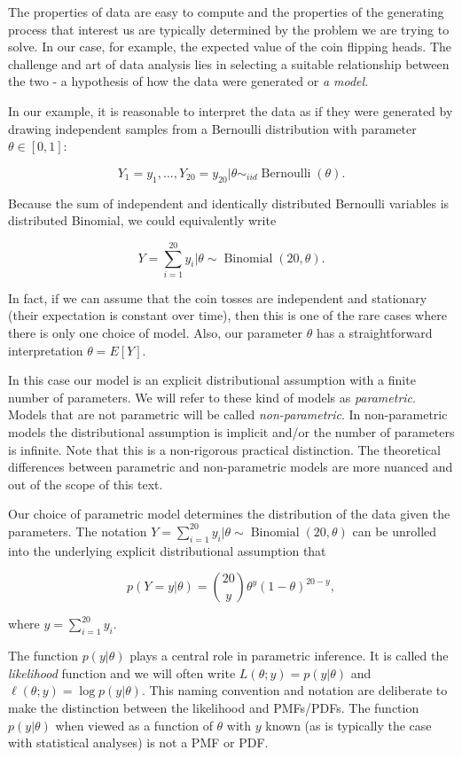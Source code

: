 \documentclass{book}
\theoremstyle{plain}%
\theoremstyle{definition}
\DeclareMathOperator{\Binomial}{Binomial}
\DeclareMathOperator{\Bernoulli}{Bernoulli}
\begin{document}
The properties of data are easy to compute and the properties of the generating process that interest us are typically determined by the problem we are trying to solve. In our case, for example, the expected value of the coin flipping heads. The challenge and art of data analysis lies in selecting a suitable relationship between the two - a hypothesis of how the data were generated or \emph{a model}.

In our example, it is reasonable to interpret the data as if they were generated by drawing independent samples from a Bernoulli distribution with parameter $\theta \in [0,1]$:

$$Y_1 = y_1,...,Y_{20} = y_{20}|\theta\sim_{iid} \Bernoulli(\theta).$$

Because the sum of independent and identically distributed Bernoulli variables is distributed Binomial, we could equivalently write 

$$Y = \sum_{i = 1}^{20} y_i|\theta \sim \Binomial(20, \theta).$$

In fact, if we can assume that the coin tosses are independent and stationary (their expectation is constant over time), then this is one of the rare cases where there is only one choice of model. Also, our parameter $\theta$ has a straightforward interpretation $\theta = E[Y]$.

In this case our model is an explicit distributional assumption with a finite number of parameters. We will refer to these kind of models as \emph{parametric}. Models that are not parametric will be called \emph{non-parametric}. In non-parametric models the distributional assumption is implicit and/or the number of parameters is infinite. Note that this is a non-rigorous practical distinction. The theoretical differences between parametric and non-parametric models are more nuanced and out of the scope of this text.

Our choice of parametric model determines the distribution of the data given the parameters. The notation $Y = \sum_{i = 1}^{20} y_i|\theta \sim \Binomial(20, \theta)$ can be unrolled into the underlying explicit distributional assumption that

$$p(Y = y|\theta) = {20 \choose y} \theta^{y}(1-\theta)^{20 - y},$$

where $y = \sum_{i = 1}^{20} y_i$.

The function $p(y|\theta)$ plays a central role in parametric inference. It is called the \textit{likelihood} function and we will often write $L(\theta;y) = p(y|\theta)$ and $\ell(\theta;y) = \log p(y|\theta)$. This naming convention and notation are deliberate to make the distinction between the likelihood and PMFs/PDFs. The function $p(y|\theta)$ when viewed as a function of $\theta$ with $y$ known (as is typically the case with statistical analyses) is not a PMF or PDF.
\end{document}
